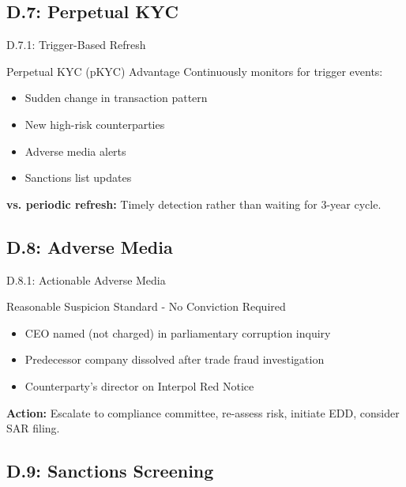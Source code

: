 \documentclass{beamer}
\begin{document}
		\subsection{D.7: Perpetual KYC}
		
		\begin{frame}{D.7.1: Trigger-Based Refresh}
			\begin{block}{Perpetual KYC (pKYC) Advantage}
				Continuously monitors for trigger events:
				\begin{itemize}
					\item Sudden change in transaction pattern
					\item New high-risk counterparties
					\item Adverse media alerts
					\item Sanctions list updates
				\end{itemize}
				\textbf{vs. periodic refresh:} Timely detection rather than waiting for 3-year cycle.
			\end{block}
		\end{frame}
		
		\subsection{D.8: Adverse Media}
		
		\begin{frame}{D.8.1: Actionable Adverse Media}
			\begin{block}{Reasonable Suspicion Standard - No Conviction Required}
				\begin{itemize}
					\item CEO named (not charged) in parliamentary corruption inquiry
					\item Predecessor company dissolved after trade fraud investigation
					\item Counterparty's director on Interpol Red Notice
				\end{itemize}
			\end{block}
			\textbf{Action:} Escalate to compliance committee, re-assess risk, initiate EDD, consider SAR filing.
		\end{frame}
		
		\subsection{D.9: Sanctions Screening}
		
\end{document}
